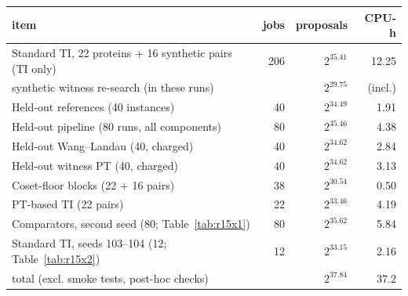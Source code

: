 \begin{tabular}{lrrr}
\toprule
item & jobs & proposals & CPU-h \\
\midrule
Standard TI, 22 proteins + 16 synthetic pairs (TI only) & 206 & $2^{35.41}$ & 12.25 \\
\quad synthetic witness re-search (in these runs) & & $2^{29.75}$ & (incl.) \\
Held-out references (40 instances) & 40 & $2^{34.49}$ & 1.91 \\
Held-out pipeline (80 runs, all components) & 80 & $2^{35.46}$ & 4.38 \\
Held-out Wang--Landau (40, charged) & 40 & $2^{34.62}$ & 2.84 \\
Held-out witness PT (40, charged) & 40 & $2^{34.62}$ & 3.13 \\
Coset-floor blocks (22 + 16 pairs) & 38 & $2^{30.54}$ & 0.50 \\
PT-based TI (22 pairs) & 22 & $2^{33.46}$ & 4.19 \\
Comparators, second seed (80; Table~\ref{tab:r15x1}) & 80 & $2^{35.62}$ & 5.84 \\
Standard TI, seeds 103--104 (12; Table~\ref{tab:r15x2}) & 12 & $2^{33.15}$ & 2.16 \\
\midrule
total (excl. smoke tests, post-hoc checks) & & $2^{37.84}$ & 37.2 \\
\bottomrule
\end{tabular}
